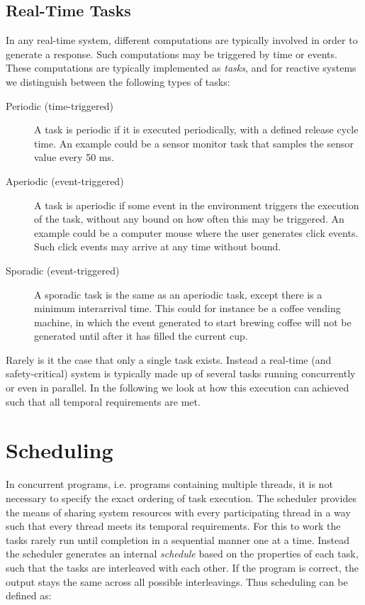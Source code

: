 \subsection{Real-Time Tasks} %
\label{sub:real_time_tasks}
In any real-time system, different computations are typically involved in order to generate a response. Such computations may be triggered by time or events. These computations are typically implemented as \textit{tasks}, and for reactive systems we distinguish between the following types of tasks:
\begin{description}
	\item[Periodic (time-triggered)] A task is periodic if it is executed periodically, with a defined release cycle time. An example could be a sensor monitor task that samples the sensor value every 50 ms.
	\item[Aperiodic (event-triggered)] A task is aperiodic if some event in the environment triggers the execution of the task, without any bound on how often this may be triggered. An example could be a computer mouse where the user generates click events. Such click events may arrive at any time without bound.
	\item[Sporadic (event-triggered)] A sporadic task is the same as an aperiodic task, except there is a minimum interarrival time. This could for instance be a coffee vending machine, in which the event generated to start brewing coffee will not be generated until after it has filled the current cup.
\end{description}

Rarely is it the case that only a single task exists. Instead a real-time (and safety-critical) system is typically made up of several tasks running concurrently or even in parallel. In the following we look at how this execution can achieved such that all temporal requirements are met.


\section{Scheduling} %
\label{sec:scheduling}
In concurrent programs, i.e. programs containing multiple threads, it is not necessary to specify the exact ordering of task execution. The scheduler provides the means of sharing system resources with every participating thread in a way such that every thread meets its temporal requirements. For this to work the tasks rarely run until completion in a sequential manner one at a time. Instead the scheduler generates an internal \textit{schedule} based on the properties of each task, such that the tasks are interleaved with each other. If the program is correct, the output stays the same across all possible interleavings. Thus scheduling can be defined as:

